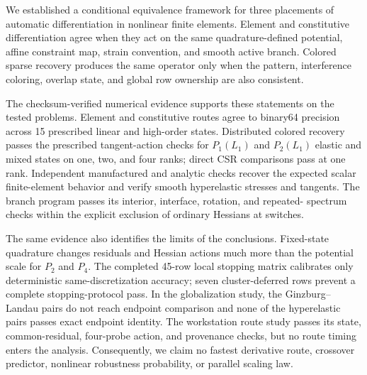 \label{sec:conclusion}

We established a conditional equivalence framework for three placements of
automatic differentiation in nonlinear finite elements. Element and
constitutive differentiation agree when they act on the same quadrature-defined
potential, affine constraint map, strain convention, and smooth active branch.
Colored sparse recovery produces the same operator only when the pattern,
interference coloring, overlap state, and global row ownership are also
consistent.

The checksum-verified numerical evidence supports these statements on the
tested problems.
Element and constitutive routes agree to binary64 precision across 15 prescribed
linear and high-order states. Distributed colored recovery passes the prescribed
tangent-action checks for $P_1(L_1)$ and $P_2(L_1)$ elastic and mixed states on
one, two, and four ranks; direct CSR comparisons pass at one rank.
Independent manufactured and analytic checks recover the expected scalar
finite-element behavior and verify smooth hyperelastic stresses and tangents.
The branch program passes its interior, interface, rotation, and repeated-
spectrum checks within the explicit exclusion of ordinary Hessians at switches.

The same evidence also identifies the limits of the conclusions. Fixed-state
quadrature changes residuals and Hessian actions much more than the potential
scale for $P_2$ and $P_4$. The completed 45-row local stopping matrix calibrates
only deterministic same-discretization accuracy; seven cluster-deferred rows
prevent a complete stopping-protocol pass. In the globalization study, the
Ginzburg--Landau pairs do not reach endpoint comparison and none of the
hyperelastic pairs passes exact endpoint identity. The workstation route study
passes its state, common-residual, four-probe action, and provenance checks, but
no route timing enters the analysis. Consequently, we claim no fastest
derivative route, crossover predictor, nonlinear robustness probability, or
parallel scaling law.
